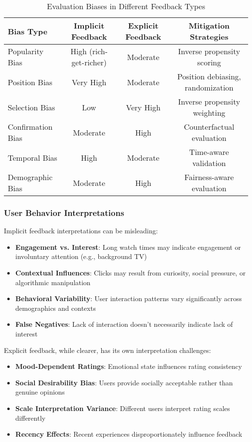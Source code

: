 \begin{table}[h]
\centering
\caption{Evaluation Biases in Different Feedback Types}
\label{tab:evaluation_biases}
\begin{tabular}{@{}lccc@{}}
\toprule
Bias Type & Implicit Feedback & Explicit Feedback & Mitigation Strategies \\
\midrule
Popularity Bias & High (rich-get-richer) & Moderate & Inverse propensity scoring \\
Position Bias & Very High & Moderate & Position debiasing, randomization \\
Selection Bias & Low & Very High & Inverse propensity weighting \\
Confirmation Bias & Moderate & High & Counterfactual evaluation \\
Temporal Bias & High & Moderate & Time-aware validation \\
Demographic Bias & Moderate & High & Fairness-aware evaluation \\
\bottomrule
\end{tabular}
\end{table}

\subsubsection{User Behavior Interpretations}
Implicit feedback interpretations can be misleading:

\begin{itemize}
    \item \textbf{Engagement vs. Interest}: Long watch times may indicate engagement or involuntary attention (e.g., background TV)
    \item \textbf{Contextual Influences}: Clicks may result from curiosity, social pressure, or algorithmic manipulation
    \item \textbf{Behavioral Variability}: User interaction patterns vary significantly across demographics and contexts
    \item \textbf{False Negatives}: Lack of interaction doesn't necessarily indicate lack of interest
\end{itemize}

Explicit feedback, while clearer, has its own interpretation challenges:

\begin{itemize}
    \item \textbf{Mood-Dependent Ratings}: Emotional state influences rating consistency
    \item \textbf{Social Desirability Bias}: Users provide socially acceptable rather than genuine opinions
    \item \textbf{Scale Interpretation Variance}: Different users interpret rating scales differently
    \item \textbf{Recency Effects}: Recent experiences disproportionately influence feedback
\end{itemize}

